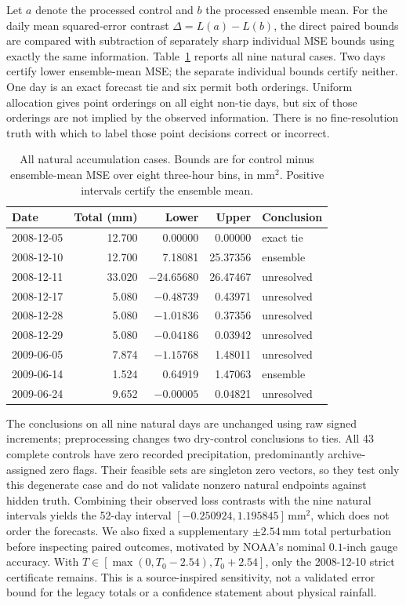 \documentclass[12pt]{article}
\begin{document}
Let $a$ denote the processed control and $b$ the processed ensemble mean.
For the daily mean squared-error contrast $\Delta=L(a)-L(b)$, the direct
paired bounds are compared with subtraction of separately sharp individual
MSE bounds using exactly the same information. Table~\ref{tab:noaa-natural}
reports all nine natural cases. Two days certify lower ensemble-mean MSE;
the separate individual bounds certify neither. One day is an exact forecast
tie and six permit both orderings. Uniform allocation gives point orderings
on all eight non-tie days, but six of those orderings are not implied by the
observed information. There is no fine-resolution truth with which to label
those point decisions correct or incorrect.

\begin{table}[t]
\centering
\caption{All natural accumulation cases. Bounds are for control minus
ensemble-mean MSE over eight three-hour bins, in $\mathrm{mm}^2$.
Positive intervals certify the ensemble mean.}
\label{tab:noaa-natural}
\begin{tabular}{lrrrl}
\hline
Date & Total (mm) & Lower & Upper & Conclusion\\
\hline
2008-12-05 & 12.700 & 0.00000 & 0.00000 & exact tie\\
2008-12-10 & 12.700 & 7.18081 & 25.37356 & ensemble\\
2008-12-11 & 33.020 & $-24.65680$ & 26.47467 & unresolved\\
2008-12-17 & 5.080 & $-0.48739$ & 0.43971 & unresolved\\
2008-12-28 & 5.080 & $-1.01836$ & 0.37356 & unresolved\\
2008-12-29 & 5.080 & $-0.04186$ & 0.03942 & unresolved\\
2009-06-05 & 7.874 & $-1.15768$ & 1.48011 & unresolved\\
2009-06-14 & 1.524 & 0.64919 & 1.47063 & ensemble\\
2009-06-24 & 9.652 & $-0.00005$ & 0.04821 & unresolved\\
\hline
\end{tabular}
\end{table}

The conclusions on all nine natural days are unchanged using raw signed
increments; preprocessing changes two dry-control conclusions to ties.
All 43 complete controls have zero recorded precipitation, predominantly
archive-assigned zero flags. Their feasible sets are singleton zero vectors,
so they test only this degenerate case and do not validate nonzero natural
endpoints against hidden truth. Combining their observed loss contrasts with
the nine natural intervals yields the 52-day interval
$[-0.250924,1.195845]\,\mathrm{mm}^2$, which does not order the forecasts.
We also fixed a supplementary $\pm2.54$\,mm total perturbation before inspecting
paired outcomes, motivated by NOAA's nominal $0.1$-inch gauge accuracy.
With $T\in[\max(0,T_0-2.54),T_0+2.54]$, only the 2008-12-10 strict certificate
remains. This is a source-inspired sensitivity, not a validated error bound
for the legacy totals or a confidence statement about physical rainfall.
\end{document}
